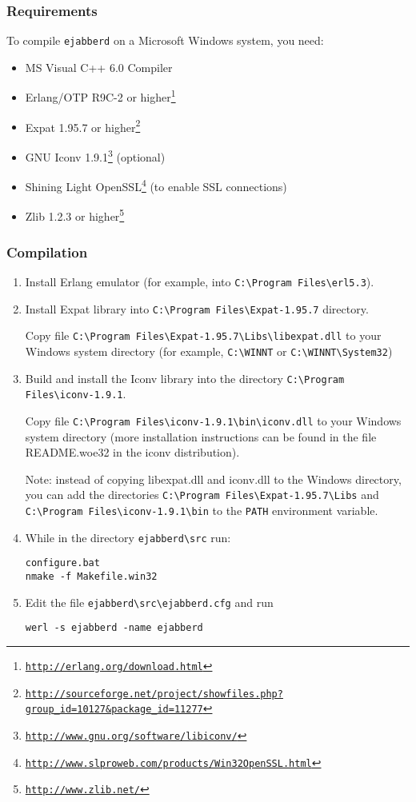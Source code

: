 \documentclass[a4paper,10pt]{book}
\newcommand{\ejabberd}{\texttt{ejabberd}}
\gdef\footahref#1#2{#2\footnote{\href{#1}{\texttt{#1}}}}
\begin{document}
\subsubsection{Requirements}
\label{windowsreq}

To compile \ejabberd{} on a Microsoft Windows system, you need:
\begin{itemize}
\item MS Visual C++ 6.0 Compiler
\item \footahref{http://erlang.org/download.html}{Erlang/OTP R9C-2 or higher}
\item \footahref{http://sourceforge.net/project/showfiles.php?group\_id=10127\&package\_id=11277}{Expat 1.95.7 or higher}
\item
\footahref{http://www.gnu.org/software/libiconv/}{GNU Iconv 1.9.1}
(optional)
\item \footahref{http://www.slproweb.com/products/Win32OpenSSL.html}{Shining Light OpenSSL}
(to enable SSL connections)
\item \footahref{http://www.zlib.net/}{Zlib 1.2.3 or higher}
\end{itemize}


\subsubsection{Compilation}
\label{windowscom}

\begin{enumerate}
\item Install Erlang emulator (for example, into \verb|C:\Program Files\erl5.3|).
\item Install Expat library into \verb|C:\Program Files\Expat-1.95.7|
  directory.

  Copy file \verb|C:\Program Files\Expat-1.95.7\Libs\libexpat.dll|
  to your Windows system directory (for example, \verb|C:\WINNT| or
  \verb|C:\WINNT\System32|)
\item Build and install the Iconv library into the directory
  \verb|C:\Program Files\iconv-1.9.1|.

  Copy file \verb|C:\Program Files\iconv-1.9.1\bin\iconv.dll| to your
  Windows system directory (more installation instructions can be found in the
  file README.woe32 in the iconv distribution).

  Note: instead of copying libexpat.dll and iconv.dll to the Windows
  directory, you can add the directories
  \verb|C:\Program Files\Expat-1.95.7\Libs| and
  \verb|C:\Program Files\iconv-1.9.1\bin| to the \verb|PATH| environment
  variable.
\item While in the directory \verb|ejabberd\src| run:
\begin{verbatim}
configure.bat
nmake -f Makefile.win32
\end{verbatim}
\item Edit the file \verb|ejabberd\src\ejabberd.cfg| and run
\begin{verbatim}
werl -s ejabberd -name ejabberd
\end{verbatim}
\end{enumerate}
\end{document}
